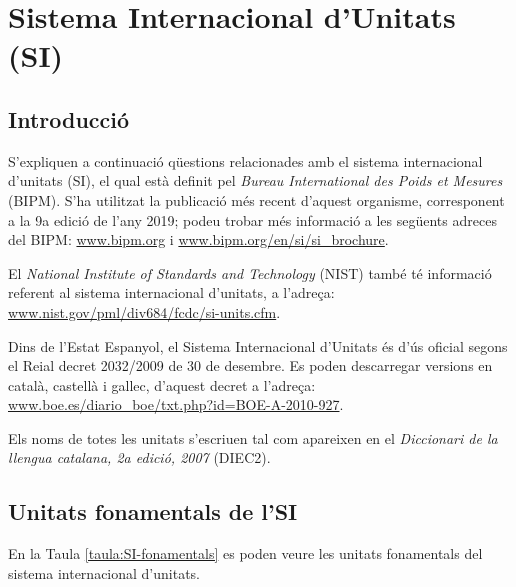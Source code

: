 \chapter{Sistema Internacional d'Unitats (SI)}\label{sec:SI}

\section{Introducció}
S'expliquen a continuació qüestions relacionades amb el sistema
internacional d'unitats (SI), el qual està definit pel  \textit{Bureau
International des Poids et Mesures} (BIPM). S'ha utilitzat la publicació més recent d'aquest organisme, corresponent a la 9a edició de l'any 2019; podeu trobar més informació a les següents adreces del BIPM: \href{http://www.bipm.org/}{www.bipm.org} i
\href{http://www.bipm.org/en/si/si_brochure/}{www.bipm.org/en/si/si\_brochure}.

El  \textit{National Institute of Standards and Technology} (NIST) també té informació referent al sistema
internacional d'unitats, a l'adreça: \href{http://www.nist.gov/pml/div684/fcdc/si-units.cfm}
{www.nist.gov/pml/div684/fcdc/si-units.cfm}.

Dins de l'Estat Espanyol, el Sistema Internacional d'Unitats és d'ús oficial segons el Reial decret 2032/2009 de 30 de desembre. Es poden descarregar versions en català, castellà i gallec, d'aquest decret a l'adreça: \href{http://www.boe.es/diario_boe/txt.php?id=BOE-A-2010-927}
{www.boe.es/diario\_boe/txt.php?id=BOE-A-2010-927}.

Els noms de totes les unitats s'escriuen tal com apareixen en el  \textit{Diccionari de la llengua catalana, 2a edició, 2007} (DIEC2).

\section{Unitats fonamentals de l'SI}

En la Taula \vref{taula:SI-fonamentals} es poden veure les unitats
fonamentals del sistema internacional d'unitats.

